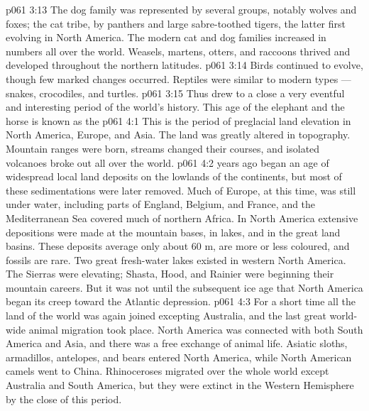 \vs p061 3:13 The dog family was represented by several groups, notably wolves and foxes; the cat tribe, by panthers and large sabre\hyp{}toothed tigers, the latter first evolving in North America. The modern cat and dog families increased in numbers all over the world. Weasels, martens, otters, and raccoons thrived and developed throughout the northern latitudes.
\vs p061 3:14 Birds continued to evolve, though few marked changes occurred. Reptiles were similar to modern types --- snakes, crocodiles, and turtles.
\vs p061 3:15 \pc Thus drew to a close a very eventful and interesting period of the world’s history. This age of the elephant and the horse is known as the 
\vs p061 4:1 This is the period of preglacial land elevation in North America, Europe, and Asia. The land was greatly altered in topography. Mountain ranges were born, streams changed their courses, and isolated volcanoes broke out all over the world.
\vs p061 4:2 \pc {} years ago began an age of widespread local land deposits on the lowlands of the continents, but most of these sedimentations were later removed. Much of Europe, at this time, was still under water, including parts of England, Belgium, and France, and the Mediterranean Sea covered much of northern Africa. In North America extensive depositions were made at the mountain bases, in lakes, and in the great land basins. These deposits average only about 60 m, are more or less coloured, and fossils are rare. Two great fresh\hyp{}water lakes existed in western North America. The Sierras were elevating; Shasta, Hood, and Rainier were beginning their mountain careers. But it was not until the subsequent ice age that North America began its creep toward the Atlantic depression.
\vs p061 4:3 For a short time all the land of the world was again joined excepting Australia, and the last great world\hyp{}wide animal migration took place. North America was connected with both South America and Asia, and there was a free exchange of animal life. Asiatic sloths, armadillos, antelopes, and bears entered North America, while North American camels went to China. Rhinoceroses migrated over the whole world except Australia and South America, but they were extinct in the Western Hemisphere by the close of this period.
